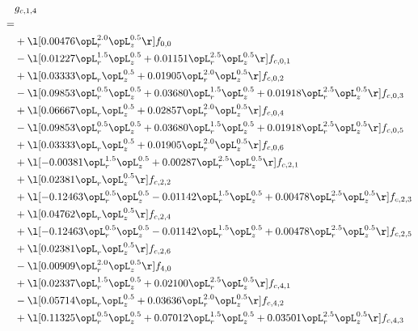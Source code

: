 \begin{alignat}{2} 
\label{eq:g_14_0} 
& g_{c,1,4} \nonumber \\ 
 = \\ 
& + \l[  0.00476 \opL_r^{2.0} \opL_z^{0.5}  \r] f_{0,0} \nonumber \\ 
& - \l[  0.01227 \opL_r^{1.5} \opL_z^{0.5} +  0.01151 \opL_r^{2.5} \opL_z^{0.5}  \r] f_{c,0,1} \nonumber \\ 
& + \l[  0.03333 \opL_r \opL_z^{0.5} +  0.01905 \opL_r^{2.0} \opL_z^{0.5}  \r] f_{c,0,2} \nonumber \\ 
& - \l[  0.09853 \opL_r^{0.5} \opL_z^{0.5} +  0.03680 \opL_r^{1.5} \opL_z^{0.5} +  0.01918 \opL_r^{2.5} \opL_z^{0.5}  \r] f_{c,0,3} \nonumber \\ 
& + \l[  0.06667 \opL_r \opL_z^{0.5} +  0.02857 \opL_r^{2.0} \opL_z^{0.5}  \r] f_{c,0,4} \nonumber \\ 
& - \l[  0.09853 \opL_r^{0.5} \opL_z^{0.5} +  0.03680 \opL_r^{1.5} \opL_z^{0.5} +  0.01918 \opL_r^{2.5} \opL_z^{0.5}  \r] f_{c,0,5} \nonumber \\ 
& + \l[  0.03333 \opL_r \opL_z^{0.5} +  0.01905 \opL_r^{2.0} \opL_z^{0.5}  \r] f_{c,0,6} \nonumber \\ 
& + \l[  -0.00381 \opL_r^{1.5} \opL_z^{0.5} +  0.00287 \opL_r^{2.5} \opL_z^{0.5}  \r] f_{c,2,1} \nonumber \\ 
& + \l[  0.02381 \opL_r \opL_z^{0.5}  \r] f_{c,2,2} \nonumber \\ 
& + \l[  -0.12463 \opL_r^{0.5} \opL_z^{0.5}   -0.01142 \opL_r^{1.5} \opL_z^{0.5} +  0.00478 \opL_r^{2.5} \opL_z^{0.5}  \r] f_{c,2,3} \nonumber \\ 
& + \l[  0.04762 \opL_r \opL_z^{0.5}  \r] f_{c,2,4} \nonumber \\ 
& + \l[  -0.12463 \opL_r^{0.5} \opL_z^{0.5}   -0.01142 \opL_r^{1.5} \opL_z^{0.5} +  0.00478 \opL_r^{2.5} \opL_z^{0.5}  \r] f_{c,2,5} \nonumber \\ 
& + \l[  0.02381 \opL_r \opL_z^{0.5}  \r] f_{c,2,6} \nonumber \\ 
& - \l[  0.00909 \opL_r^{2.0} \opL_z^{0.5}  \r] f_{4,0} \nonumber \\ 
& + \l[  0.02337 \opL_r^{1.5} \opL_z^{0.5} +  0.02100 \opL_r^{2.5} \opL_z^{0.5}  \r] f_{c,4,1} \nonumber \\ 
& - \l[  0.05714 \opL_r \opL_z^{0.5} +  0.03636 \opL_r^{2.0} \opL_z^{0.5}  \r] f_{c,4,2} \nonumber \\ 
& + \l[  0.11325 \opL_r^{0.5} \opL_z^{0.5} +  0.07012 \opL_r^{1.5} \opL_z^{0.5} +  0.03501 \opL_r^{2.5} \opL_z^{0.5}  \r] f_{c,4,3} \nonumber \\ 

\end{alignat}

